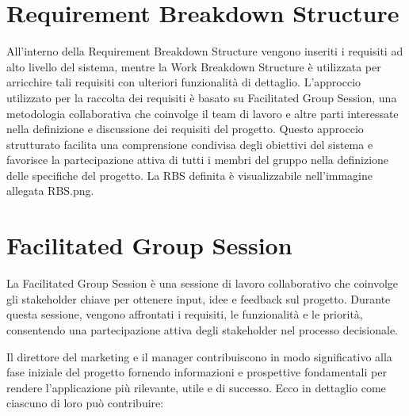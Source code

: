 \documentclass[oneside]{book}
\begin{document}
\section{Requirement Breakdown Structure}
All'interno della Requirement Breakdown Structure vengono inseriti i requisiti ad alto livello del sistema, mentre la Work Breakdown Structure è utilizzata per arricchire tali requisiti con ulteriori funzionalità di dettaglio. \newline L'approccio utilizzato per la raccolta dei requisiti è basato su Facilitated Group Session, una metodologia collaborativa che coinvolge il team di lavoro e altre parti interessate nella definizione e discussione dei requisiti del progetto. \newline Questo approccio strutturato facilita una comprensione condivisa degli obiettivi del sistema e favorisce la partecipazione attiva di tutti i membri del gruppo nella definizione delle specifiche del progetto.
\newline La RBS definita è visualizzabile nell’immagine allegata RBS.png.

\section{Facilitated Group Session}

La Facilitated Group Session è una sessione di lavoro collaborativo che coinvolge gli stakeholder chiave per ottenere input, idee e feedback sul progetto. Durante questa sessione, vengono affrontati i requisiti, le funzionalità e le priorità, consentendo una partecipazione attiva degli stakeholder nel processo decisionale.

Il direttore del marketing e il manager contribuiscono in modo significativo alla fase iniziale del progetto fornendo informazioni e prospettive fondamentali per rendere l'applicazione più rilevante, utile e di successo. Ecco in dettaglio come ciascuno di loro può contribuire:
\end{document}
